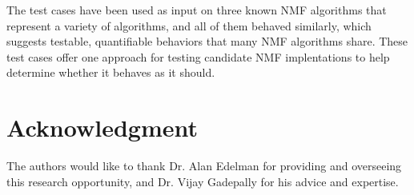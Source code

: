 \documentclass[conference]{IEEEtran}
\begin{document}
The test cases have been used as input on three known NMF algorithms that represent a variety of algorithms, and all of them behaved similarly, which suggests testable, quantifiable behaviors that many NMF algorithms share.  These test cases offer one approach for testing candidate NMF implentations to help determine whether it behaves as it should.





\section*{Acknowledgment}
The authors would like to thank Dr. Alan Edelman for providing and overseeing this research opportunity, and Dr. Vijay Gadepally for his advice and expertise.






\end{document}
